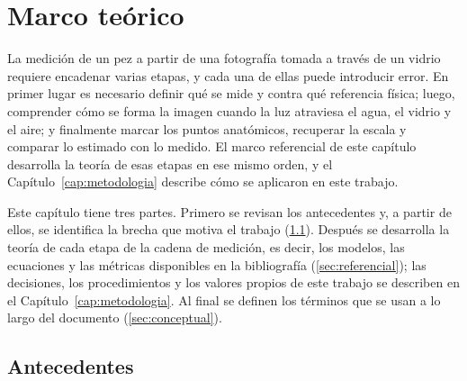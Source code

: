\chapter{Marco teórico}
\label{cap:marco}

La medición de un pez a partir de una fotografía tomada a través de un vidrio requiere encadenar varias etapas, y cada una de ellas puede introducir error. En primer lugar es necesario definir qué se mide y contra qué referencia física; luego, comprender cómo se forma la imagen cuando la luz atraviesa el agua, el vidrio y el aire; y finalmente marcar los puntos anatómicos, recuperar la escala y comparar lo estimado con lo medido. El marco referencial de este capítulo desarrolla la teoría de esas etapas en ese mismo orden, y el Capítulo~\ref{cap:metodologia} describe cómo se aplicaron en este trabajo.

Este capítulo tiene tres partes. Primero se revisan los antecedentes y, a partir de ellos, se identifica la brecha que motiva el trabajo (\ref{sec:antecedentes}). Después se desarrolla la teoría de cada etapa de la cadena de medición, es decir, los modelos, las ecuaciones y las métricas disponibles en la bibliografía (\ref{sec:referencial}); las decisiones, los procedimientos y los valores propios de este trabajo se describen en el Capítulo~\ref{cap:metodologia}. Al final se definen los términos que se usan a lo largo del documento (\ref{sec:conceptual}).

\section{Antecedentes}
\label{sec:antecedentes}

